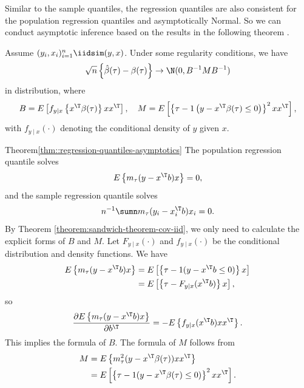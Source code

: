 Similar to the sample quantiles, the regression quantiles are also
consistent for the population regression quantiles and asymptotically
Normal. So we can conduct asymptotic inference based on the results
in the following theorem \citep{angrist2006quantile}.


\begin{theorem}\label{thm::regression-quantiles-asymptotics}
Assume $(y_{i},x_{i})_{i=1}^{n}\iidsim(y,x)$. Under some regularity
conditions, we have
\[
\sqrt{n}\left\{ \hat{\beta}(\tau)-\beta(\tau)\right\} \rightarrow\N(0,B^{-1}MB^{-1})
\]
in distribution, where 
\[
B=E\left[f_{y\mid x}\left\{ x^{\T}\beta(\tau)\right\} xx^{\T}\right],\quad M=E\left[\left\{ \tau-1\left(y-x^{\T}\beta(\tau)\leq0\right)\right\} ^{2}xx^{\T}\right],
\]
with $f_{y\mid x}(\cdot)$ denoting the conditional density of $y$
given $x$.
\end{theorem}


\begin{myproof}{Theorem}{\ref{thm::regression-quantiles-asymptotics}}
The population regression quantile solves
\[
E\left\{ m_{\tau}(y-x^{\T}b)x\right\} =0,
\]
and the sample regression quantile solves
\[
n^{-1}\sumn m_{\tau}(y_{i}-x_{i}^{\T}b)x_{i}=0.
\]
By Theorem \ref{theorem:sandwich-theorem-cov-iid}, 
we only need to calculate the explicit forms of $B$
and $M$. Let $F_{y\mid x}(\cdot)$ and $f_{y\mid x}(\cdot)$ be the
conditional distribution and density functions. We have
\begin{align*}
E\left\{ m_{\tau}(y-x^{\T}b)x\right\}  & =E\left[\left\{ \tau-1(y-x^{\T}b\leq0)\right\} x\right]\\
 & =E\left[\left\{ \tau-F_{y\mid x}(x^{\T}b)\right\} x\right],
\end{align*}
so 
\[
\frac{\partial E\left\{ m_{\tau}(y-x^{\T}b)x\right\} }{\partial b^{\T}}
=-E\left\{ f_{y\mid x}(x^{\T}b)xx^{\T}\right\} .
\]
This implies the formula of $B$. The formula of $M$ follows from
\begin{align*}
M & =E\left\{ m_{\tau}^{2}(y-x^{\T}\beta(\tau))xx^{\T}\right\} \\
 & =E\left[\left\{ \tau-1(y-x^{\T}\beta(\tau)\leq0)\right\} ^{2}xx^{\T}\right].
\end{align*}
\end{myproof}



